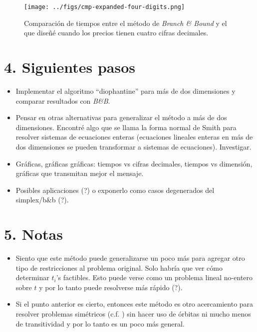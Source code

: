 \documentclass[11pt]{article}
\begin{document}
\begin{figure}[h]
    \centering
    \texttt{[image: ../figs/cmp-expanded-four-digits.png]}
	\caption{Comparación de tiempos entre el método de \textit{Branch \& Bound} y el que diseñé
	cuando los precios tienen cuatro cifras decimales.}
    \label{fig:4d}
\end{figure}


\section*{4. Siguientes pasos}

\begin{itemize}
    \item Implementar el algoritmo ``diophantine'' para más de dos dimensiones y comparar resultados
		con \textit{B\&B}.
	\item Pensar en otras alternativas para generalizar el método a más de dos dimensiones.
		Encontré algo que se llama la forma normal de Smith para resolver sistemas de ecuaciones
		enteras (ecuaciones lineales enteras en más de dos dimensiones se pueden transformar a
		sistemas de ecuaciones). Investigar.
    \item Gráficas, gráficas gráficas: tiempos vs cifras decimales, tiempos vs dimensión, gráficas
		que transmitan mejor el mensaje.
	\item Posibles aplicaciones (?) o exponerlo como casos degenerados del simplex/b\&b (?).
\end{itemize}

\section*{5. Notas}
\begin{itemize}
	\item Siento que este método puede generalizarse un poco más para agregar otro tipo de
		restricciones al problema original. Solo habría que ver cómo determinar $t_i$'s factibles.
		Esto puede verse como un problema lineal no-entero sobre $t$ y por lo tanto puede resolverse
		más rápido (?).
	\item Si el punto anterior es cierto, entonces este método es otro acercamiento para resolver
		problemas simétricos (c.f. \cite{sip}) sin hacer uso de órbitas ni mucho menos de
		transitividad y por lo tanto es un poco más general.
\end{itemize}



\end{document}
